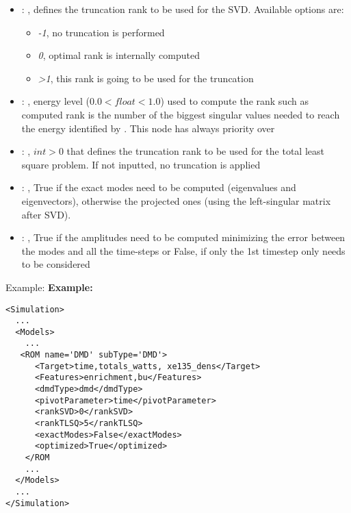\begin{itemize}
    \item {}: , 
      defines the truncation rank to be used for the SVD.
      Available options are:                                                  \begin{itemize}
      \item \textit{-1}, no truncation is performed
      \item \textit{0}, optimal rank is internally computed
      \item \textit{>1}, this rank is going to be used for the truncation
      \end{itemize}

    \item {}: , 
      energy level ($0.0 < float < 1.0$) used to compute the rank such
      as computed rank is the number of the biggest singular values needed to reach the energy
      identified by                                                    . This
      node has always priority over  

    \item {}: , 
      $int > 0$ that defines the truncation rank to be used for the total
      least square problem. If not inputted, no truncation is applied

    \item {}: , 
      True if the exact modes need to be computed (eigenvalues and
      eigenvectors),   otherwise the projected ones (using the left-singular matrix after SVD).

    \item {}: , 
      True if the amplitudes need to be computed minimizing the error
      between the modes and all the time-steps or False, if only the 1st timestep only needs to be
      considered
  \end{itemize}

\hspace{24pt}
Example:
\textbf{Example:}
\begin{lstlisting}[style=XML,morekeywords={name,subType}]
<Simulation>
  ...
  <Models>
    ...
   <ROM name='DMD' subType='DMD'>
      <Target>time,totals_watts, xe135_dens</Target>
      <Features>enrichment,bu</Features>
      <dmdType>dmd</dmdType>
      <pivotParameter>time</pivotParameter>
      <rankSVD>0</rankSVD>
      <rankTLSQ>5</rankTLSQ>
      <exactModes>False</exactModes>
      <optimized>True</optimized>
    </ROM
    ...
  </Models>
  ...
</Simulation>
\end{lstlisting}

